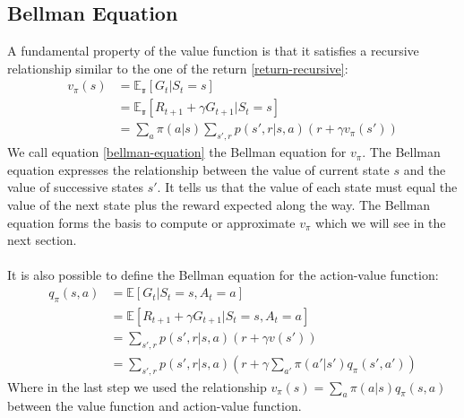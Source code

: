 \subsection{Bellman Equation}
A fundamental property of the value function is that it satisfies a recursive relationship similar to the one of the return \eqref{return-recursive}:
\begin{equation}
    \begin{split}
        v_{\pi}(s) & = \mathds{E_{\pi}}[G_t | S_t = s] \\
        & = \mathds{E_{\pi}}[R_{t+1} + \gamma G_{t+1} | S_t = s] \\
        & = \sum_a \pi(a | s) \sum_{s', r} p(s', r | s, a) (r + \gamma v_{\pi}(s'))
    \end{split}
    \label{bellman-equation}
\end{equation}
We call equation \eqref{bellman-equation} the Bellman equation for $v_{\pi}$. The Bellman equation expresses the relationship between the value of current state $s$ and the value of successive states $s'$. It tells us that the value of each state must equal the value of the next state plus the reward expected along the way. The Bellman equation forms the basis to compute or approximate $v_{\pi}$ which we will see in the next  section.\\\\
It is also possible to define the Bellman equation for the action-value function:
\begin{equation}
    \begin{split}
        q_{\pi}(s, a) & = \mathds{E}[G_t | S_t = s, A_t = a] \\
        & = \mathds{E}[R_{t+1} + \gamma G_{t+1} | S_t = s, A_t = a] \\
        & = \sum_{s', r} p(s', r | s, a) (r + \gamma v(s')) \\
        & = \sum_{s', r} p(s', r | s, a) (r + \gamma \sum_{a'} \pi(a' | s') q_{\pi}(s', a'))
    \end{split}
    \label{bellman-equation-action-value}
\end{equation}
Where in the last step we used the relationship $v_{\pi}(s) = \sum_a \pi(a | s) q_{\pi}(s, a)$ between the value function and action-value function.\\\\

